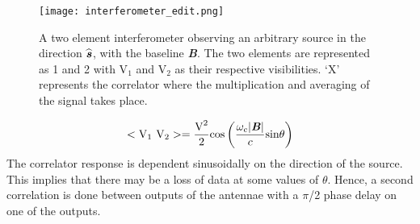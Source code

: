 \documentclass[../main/thesis_msc.tex]{subfiles}
\begin{document}
\begin{figure}
\centering
\texttt{[image: interferometer\_edit.png]}
\caption{A two element interferometer observing an arbitrary source in the direction $\widehat{\textbf{\textit{s}}}$, with the baseline \textbf{\textit{B}}. The two elements are represented as 1 and 2 with V$_1$ and V$_2$ as their respective visibilities. `X' represents the correlator where the multiplication and averaging of the signal takes place.}
\label{interf}
\end{figure}
\begin{equation}
<\textrm{V}_1 \textrm{ V}_2 > = \frac{\textrm{V}^2}{2}\textrm{cos} \left( \frac{\omega_c \vert  \textbf{\textit{B}} \vert }{c} \textrm{sin} \theta \right) 
\end{equation}
\noindent The correlator response is dependent sinusoidally on the direction of the source. This implies that there may be a loss of data at some values of $\theta$. Hence, a second correlation is done between outputs of the antennae with a $\pi$/2 phase delay on one of the outputs.
\end{document}
